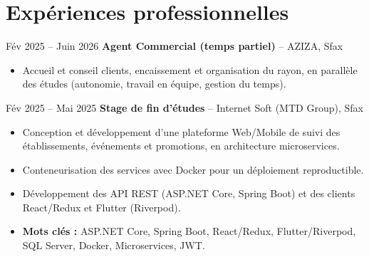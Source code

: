 \section{Expériences professionnelles}

    \vspace{0.2em}

    \begin{twocolentry}{
            Fév 2025 -- Juin 2026
        }
            \textbf{Agent Commercial (temps partiel) }-- AZIZA, Sfax
    \end{twocolentry}
    \vspace{-0.1cm}
        \begin{itemize}[label=\textbullet,left=0.3cm]
            \item Accueil et conseil clients, encaissement et organisation du rayon, en parallèle des études (autonomie, travail en équipe, gestion du temps).
        \end{itemize}

    \begin{twocolentry}{
            Fév 2025 -- Mai 2025
        }
            \textbf{Stage de fin d'études }-- Internet Soft (MTD Group), Sfax
    \end{twocolentry}
    \vspace{-0.1cm}
        \begin{itemize}[label=\textbullet,left=0.3cm]
            \item Conception et développement d'une plateforme Web/Mobile de suivi des établissements, événements et promotions, en architecture microservices.
            \vspace{-0.1cm}
            \item Conteneurisation des services avec Docker pour un déploiement reproductible.
            \vspace{-0.1cm}
            \item Développement des API REST (ASP.NET Core, Spring Boot) et des clients React/Redux et Flutter (Riverpod).
            \vspace{-0.1cm}
            \item \textbf{Mots clés :} ASP.NET Core, Spring Boot, React/Redux, Flutter/Riverpod, SQL Server, Docker, Microservices, JWT.
        \end{itemize}

